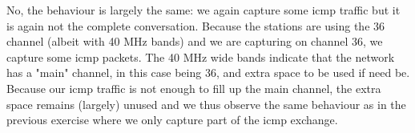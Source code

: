 No, the behaviour is largely the same: we again capture some icmp traffic but it is again not the complete conversation.
Because the stations are using the 36 channel (albeit with 40 MHz bands) and we are capturing on channel 36, we capture some icmp packets.
%
The 40 MHz wide bands indicate that the network has a "main" channel, in this case being 36, and extra space to be used if need be.
Because our icmp traffic is not enough to fill up the main channel, the extra space remains (largely) unused and we thus observe the same behaviour as in the previous exercise where we only capture part of the icmp exchange. 
